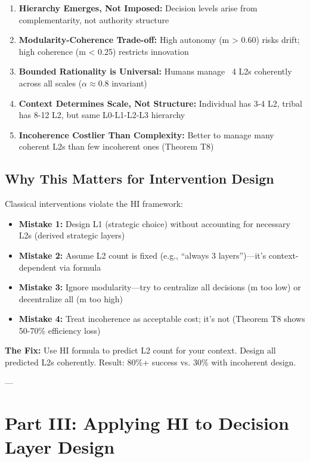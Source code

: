 \documentclass[11pt, a4paper]{article}
\begin{document}
\begin{enumerate}
    \item \textbf{Hierarchy Emerges, Not Imposed:} Decision levels arise from complementarity, not authority structure

    \item \textbf{Modularity-Coherence Trade-off:} High autonomy (m > 0.60) risks drift; high coherence (m < 0.25) restricts innovation

    \item \textbf{Bounded Rationality is Universal:} Humans manage ~4 L2s coherently across all scales ($\alpha \approx 0.8$ invariant)

    \item \textbf{Context Determines Scale, Not Structure:} Individual has 3-4 L2, tribal has 8-12 L2, but same L0-L1-L2-L3 hierarchy

    \item \textbf{Incoherence Costlier Than Complexity:} Better to manage many coherent L2s than few incoherent ones (Theorem T8)
\end{enumerate}

\subsection{Why This Matters for Intervention Design} \label{sec:ch15-part2d}

Classical interventions violate the HI framework:

\begin{itemize}[nosep]
    \item \textbf{Mistake 1:} Design L1 (strategic choice) without accounting for necessary L2s (derived strategic layers)
    \item \textbf{Mistake 2:} Assume L2 count is fixed (e.g., ``always 3 layers'')—it's context-dependent via formula
    \item \textbf{Mistake 3:} Ignore modularity—try to centralize all decisions (m too low) or decentralize all (m too high)
    \item \textbf{Mistake 4:} Treat incoherence as acceptable cost; it's not (Theorem T8 shows 50-70\% efficiency loss)
\end{itemize}

\textbf{The Fix:} Use HI formula to predict L2 count for your context. Design all predicted L2s coherently. Result: 80\%+ success vs. 30\% with incoherent design.

---

\section{Part III: Applying HI to Decision Layer Design}\label{sec:ch15-part3a}
\end{document}
